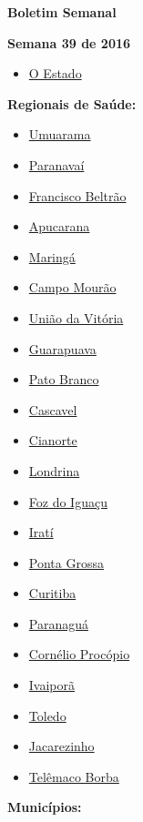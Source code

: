 \documentclass[10pt]{article} %
\begin{document}
\begin{minipage}[t]{.30\linewidth} %
\begin{mdframed}[style=sidebar,frametitle={}] %


\hypertarget{contents}{\textbf{{\large Boletim Semanal}}} 

\textbf{Semana 39 de 2016} %

\begin{itemize}
\item \hyperlink{estado}{O Estado} 
\end{itemize}


\textbf{Regionais de Saúde:}


\begin{itemize}\item \hyperlink{Umrm}{Umuarama}
\item \hyperlink{Prnv}{Paranavaí}
\item \hyperlink{FrnB}{Francisco Beltrão}
\item \hyperlink{Apcr}{Apucarana}
\item \hyperlink{Mrng}{Maringá}
\item \hyperlink{CmpM}{Campo Mourão}
\item \hyperlink{UndV}{União da Vitória}
\item \hyperlink{Grpv}{Guarapuava}
\item \hyperlink{PtBr}{Pato Branco}
\item \hyperlink{Cscv}{Cascavel}
\item \hyperlink{Cnrt}{Cianorte}
\item \hyperlink{Lndr}{Londrina}
\item \hyperlink{FzdI}{Foz do Iguaçu}
\item \hyperlink{Irat}{Iratí}
\item \hyperlink{PntG}{Ponta Grossa}
\item \hyperlink{Crtb}{Curitiba}
\item \hyperlink{Prng}{Paranaguá}
\item \hyperlink{CrnP}{Cornélio Procópio}
\item \hyperlink{Ivpr}{Ivaiporã}
\item \hyperlink{Told}{Toledo}
\item \hyperlink{Jcrz}{Jacarezinho}
\item \hyperlink{TlmB}{Telêmaco Borba}\end{itemize}
\textbf{Municípios:}


\end{mdframed}
\end{minipage}
\end{document}
